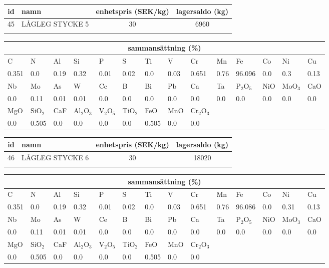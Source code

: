 \begin{center}
{\scriptsize\addtolength{\tabcolsep}{-3pt}
\begin{tabular}{clcc}
id&namn&enhetspris (SEK/kg)&lagersaldo (kg)\\
\hline
45&LÅGLEG STYCKE 5&30&6960\\\\
\end{tabular}
\begin{tabular}{llllllllllllll}
\multicolumn{14}{c}{sammansättning (\%)}\\
\hline
C&N&Al&Si&P&S&Ti&V&Cr&Mn&Fe&Co&Ni&Cu\\
\hline
0.351&0.0&0.19&0.32& 0.01&0.02&0.0&0.03& 0.651&0.76&96.096&0.0& 0.3&0.13\\
\hline
Nb&Mo&As&W&Ce&B&Bi&Pb&Ca&Ta&P$_2$O$_5$&NiO&MoO$_3$&CaO\\
\hline
0.0& 0.11& 0.01& 0.01& 0.0& 0.0& 0.0& 0.0& 0.0& 0.0& 0.0& 0.0& 0.0& 0.0\\
\hline
MgO&SiO$_2$&CaF&Al$_2$O$_3$&V$_2$O$_5$&TiO$_2$&FeO&MnO&Cr$_2$O$_3$\\
\hline
0.0& 0.505& 0.0& 0.0& 0.0& 0.0& 0.505& 0.0& 0.0\\
\end{tabular}
}
\end{center}

\begin{center}
{\scriptsize\addtolength{\tabcolsep}{-3pt}
\begin{tabular}{clcc}
id&namn&enhetspris (SEK/kg)&lagersaldo (kg)\\
\hline
46&LÅGLEG STYCKE 6&30&18020\\\\
\end{tabular}
\begin{tabular}{llllllllllllll}
\multicolumn{14}{c}{sammansättning (\%)}\\
\hline
C&N&Al&Si&P&S&Ti&V&Cr&Mn&Fe&Co&Ni&Cu\\
\hline
0.351&0.0&0.19&0.32& 0.01&0.02&0.0&0.03& 0.651&0.76&96.086&0.0& 0.31&0.13\\
\hline
Nb&Mo&As&W&Ce&B&Bi&Pb&Ca&Ta&P$_2$O$_5$&NiO&MoO$_3$&CaO\\
\hline
0.0& 0.11& 0.01& 0.01& 0.0& 0.0& 0.0& 0.0& 0.0& 0.0& 0.0& 0.0& 0.0& 0.0\\
\hline
MgO&SiO$_2$&CaF&Al$_2$O$_3$&V$_2$O$_5$&TiO$_2$&FeO&MnO&Cr$_2$O$_3$\\
\hline
0.0& 0.505& 0.0& 0.0& 0.0& 0.0& 0.505& 0.0& 0.0\\
\end{tabular}
}
\end{center}

